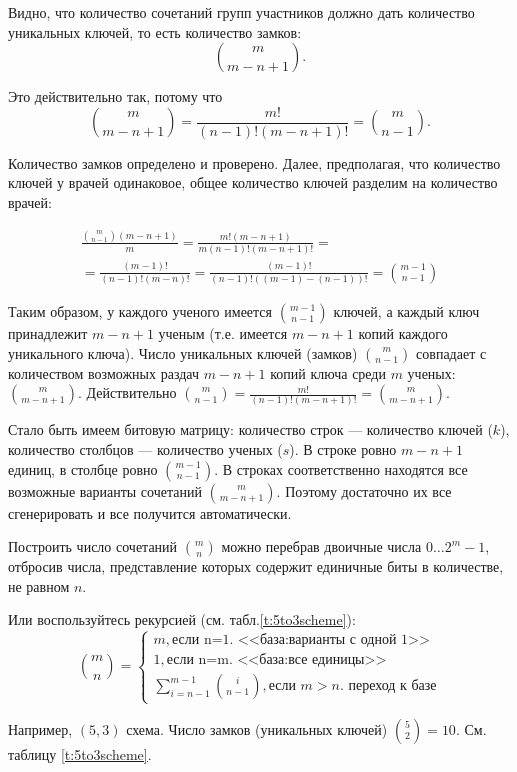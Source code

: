 Видно, что количество сочетаний групп участников должно дать количество уникальных ключей, то есть количество замков:
\[\binom{m}{m-n+1}.\]

Это действительно так, потому что \[\binom{m}{m-n+1}=\frac{m!}{(n-1)!(m-n+1)!}=\binom{m}{n-1}.\]

Количество замков определено и проверено. Далее, предполагая, что количество ключей у врачей одинаковое, общее количество ключей разделим на количество врачей:

\begin{multline*}
\frac{\binom{m}{n-1}(m-n+1)}{m}=
\frac{m!(m-n+1)}{m(n-1)!(m-n+1)!}=\\
=\frac{(m-1)!}{(n-1)!(m-n)!}=
\frac{(m-1)!}{(n-1)!((m-1)-(n-1))!}=
\binom{m-1}{n-1}
\end{multline*}

Таким образом, у каждого ученого имеется $\binom{m-1}{n-1}$ ключей, а каждый ключ принадлежит $m-n+1$ ученым (т.е. имеется $m-n+1$ копий каждого уникального ключа). Число уникальных ключей (замков) $\binom{m}{n-1}$ совпадает с количеством возможных раздач $m-n+1$ копий ключа среди $m$ ученых: $\binom{m}{m-n+1}$. Действительно $\binom{m}{n-1}=\frac{m!}{(n-1)!(m-n+1)!}=\binom{m}{m-n+1}$.

Стало быть имеем битовую матрицу: количество строк --- количество ключей ($k$), количество столбцов --- количество ученых ($s$). В строке ровно $m-n+1$ единиц, в столбце ровно $\binom{m-1}{n-1}$. В строках соответственно находятся все возможные варианты сочетаний $\binom{m}{m-n+1}$. Поэтому достаточно их все сгенерировать и все получится автоматически.

Построить число сочетаний $\binom{m}{n}$ можно перебрав двоичные числа $0\ldots 2^m-1$, отбросив числа, представление которых содержит единичные биты в количестве, не равном $n$.

Или воспользуйтесь рекурсией (см. табл.\ref{t:5to3scheme}):
\[
\binom{m}{n}=
\begin{cases}
    m, \text{если n=1. <<база:варианты с одной 1>>}\\
    1, \text{если n=m. <<база:все единицы>>}\\
    \sum_{i=n-1}^{m-1}\binom{i}{n-1},\text{если $m>n$. переход к базе}
\end{cases}
\]

Например, $(5,3)$ схема. Число замков (уникальных ключей) $\binom{5}{2}=10$. См. таблицу \ref{t:5to3scheme}.

